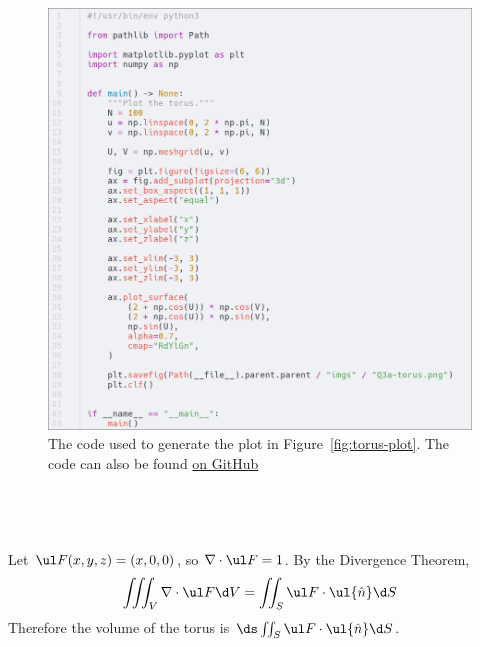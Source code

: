 \documentclass[a4paper]{article}
\begin{document}
\begin{figure}[h]
	\centering
	\includegraphics[scale=0.35]{Q3a-code}
	\caption{The code used to generate the plot in Figure~\ref{fig:torus-plot}. The code can also be found \href{https://github.com/DoctorDalek1963/uni/blob/9145bb837f02e16d45cf1807d5b1644ecd36a625/first-year/MA144-Methods-of-Mathematical-Modelling-2/Ass 4/code/plot_torus.py}{on GitHub}}
\end{figure}

\clearpage
\subsection{~}

Let $\ul F(x, y, z) = (x, 0, 0)$, so $\nabla \cdot \ul F = 1$. By the Divergence Theorem, $$\iiint_V \nabla \cdot \ul F \d V = \iint_S \ul F \cdot \ul{\hat n} \d S$$
Therefore the volume of the torus is $\ds \iint_S \ul F \cdot \ul{\hat n} \d S$.
\end{document}
